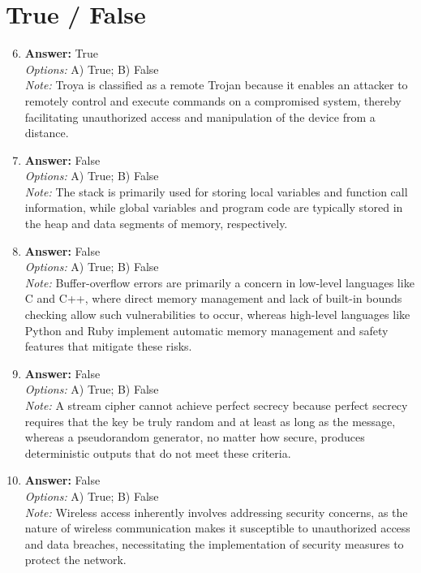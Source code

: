 \documentclass[12pt]{article}
\begin{document}
\section*{True / False}
\begin{enumerate}[label=\arabic*.]
\setcounter{enumi}{5}
\item \textbf{Answer:} True
\\ \textit{Options:} A) True; B) False
\\ \textit{Note:} Troya is classified as a remote Trojan because it enables an attacker to remotely control and execute commands on a compromised system, thereby facilitating unauthorized access and manipulation of the device from a distance.
\item \textbf{Answer:} False
\\ \textit{Options:} A) True; B) False
\\ \textit{Note:} The stack is primarily used for storing local variables and function call information, while global variables and program code are typically stored in the heap and data segments of memory, respectively.
\item \textbf{Answer:} False
\\ \textit{Options:} A) True; B) False
\\ \textit{Note:} Buffer-overflow errors are primarily a concern in low-level languages like C and C++, where direct memory management and lack of built-in bounds checking allow such vulnerabilities to occur, whereas high-level languages like Python and Ruby implement automatic memory management and safety features that mitigate these risks.
\item \textbf{Answer:} False
\\ \textit{Options:} A) True; B) False
\\ \textit{Note:} A stream cipher cannot achieve perfect secrecy because perfect secrecy requires that the key be truly random and at least as long as the message, whereas a pseudorandom generator, no matter how secure, produces deterministic outputs that do not meet these criteria.
\item \textbf{Answer:} False
\\ \textit{Options:} A) True; B) False
\\ \textit{Note:} Wireless access inherently involves addressing security concerns, as the nature of wireless communication makes it susceptible to unauthorized access and data breaches, necessitating the implementation of security measures to protect the network.
\end{enumerate}
\end{document}
